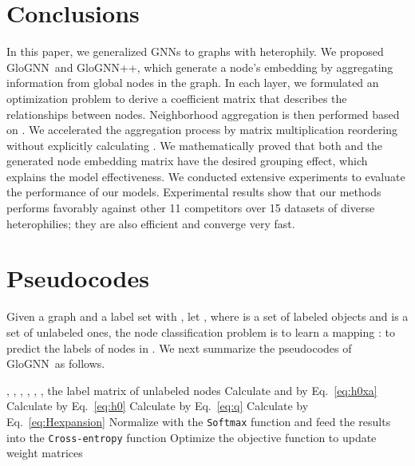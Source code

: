 \documentclass[nohyperref]{article}
\theoremstyle{plain}
\theoremstyle{definition}
\theoremstyle{remark}
\newcommand{\ada}{GloGNN}
\begin{document}
 \section{Conclusions}
\label{sec:conclusion}
In this paper,
we generalized GNNs to graphs with heterophily. 
We 
proposed \ada\ and \ada++,
which 
generate a node's embedding by aggregating information from global nodes in the graph.
In each layer,
we formulated an optimization problem to derive
a coefficient matrix  that describes the relationships between nodes.
Neighborhood aggregation is then performed based on .
We accelerated the aggregation process by matrix multiplication reordering without explicitly calculating .
We mathematically proved that both  and the generated node embedding matrix  have the desired grouping effect,
which explains the model effectiveness.
We conducted extensive experiments to evaluate the performance of our models.
Experimental results show that our methods performs favorably against other 11 competitors over 15 datasets of diverse heterophilies;
they are also efficient
and converge very fast.

 

\clearpage 







\appendix
\onecolumn

\section{Pseudocodes}
\label{sec:sup}

Given a graph  and a label set  with ,
let ,
where  is a set of labeled objects and  is a set of unlabeled
ones, the node classification problem is to learn a mapping :  to 
predict the labels
of nodes in .
We next summarize the pseudocodes of \ada\ as follows.

\begin{algorithm}
\caption{\ada}
\label{alg}
\begin{algorithmic}[1]
  , , , , , , 
  the label matrix  of unlabeled nodes
\STATE Calculate  and  by Eq.~\ref{eq:h0xa}
\STATE Calculate  by Eq.~\ref{eq:h0}
\STATE Calculate  by Eq.~\ref{eq:q}
\STATE Calculate  by Eq.~\ref{eq:Hexpansion}
\ENDFOR
\STATE Normalize  with the \texttt{Softmax} function and feed the results into the \texttt{Cross-entropy} function
\STATE Optimize the objective function to update weight matrices
\end{algorithmic}
\end{algorithm}
\end{document}
